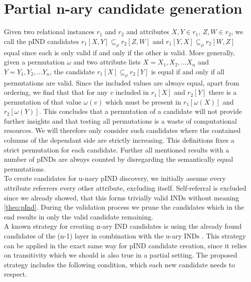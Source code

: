 \section{Partial n-ary candidate generation}
Given two relational instances $r_1$ and $r_2$ and attributes $X, Y \in r_1$, $Z, W \in r_2$, we call the pIND candidates $r_1[X,Y] \subseteq_\rho r_2[Z,W]$ and $r_1[Y,X] \subseteq_\rho r_2[W,Z]$ equal since each is only valid if and only if the other is valid. More generally, given a permutation $\omega$ and two attribute lists $X = X_1, X_2, \dots X_n$ and $Y = Y_1, Y_2, \dots Y_n$, the candidate $r_1[X] \subseteq_\rho r_2[Y]$ is equal if and only if all permutations are valid. Since the included values are always equal, apart from ordering, we find that that for any $v$ included in $r_1[X]$ and $r_2[Y]$ there is a permutation of that value $\omega(v)$ which must be present in $r_1[\omega(X)]$ and $r_2[\omega(Y)]$. This concludes that a permutation of a candidate will not provide further insights and that testing all permutations is a waste of computational resources. We will therefore only consider such candidates where the contained columns of the dependant side are strictly increasing. This definitions fixes a strict permutation for each candidate. Further all mentioned results with a number of pINDs are always counted by disregarding the semantically equal permutations.\\

\noindent To create candidates for u-nary pIND discovery, we initially assume every attribute referrers every other attribute, excluding itself. Self-referral is excluded since we already showed, that this forms trivially valid INDs without meaning \ref{theo:pInd}. During the validation process we prune the candidates which in the end results in only the valid candidate remaining. \\

\noindent A known strategy for creating n-ary IND candidates is using the already found candidates of the (n-1) layer in combination with the u-ary INDs \cite{papenbrock2015divide}. This strategy can be applied in the exact same way for pIND candidate creation, since it relies on transitivity which we should is also true in a partial setting. The proposed strategy includes the following condition, which each new candidate needs to respect. \\

